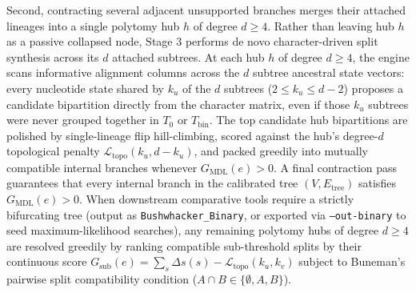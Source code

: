 \documentclass[11pt,a4paper]{article}
\begin{document}
Second, contracting several adjacent unsupported branches merges their attached lineages into a single polytomy hub $h$ of degree $d \ge 4$. Rather than leaving hub $h$ as a passive collapsed node, Stage 3 performs de novo character-driven split synthesis across its $d$ attached subtrees. At each hub $h$ of degree $d \ge 4$, the engine scans informative alignment columns across the $d$ subtree ancestral state vectors: every nucleotide state shared by $k_u$ of the $d$ subtrees ($2 \le k_u \le d - 2$) proposes a candidate bipartition directly from the character matrix, even if those $k_u$ subtrees were never grouped together in $T_0$ or $T_{\text{bin}}$. The top candidate hub bipartitions are polished by single-lineage flip hill-climbing, scored against the hub's degree-$d$ topological penalty $\mathcal{L}_{\text{topo}}(k_u, d - k_u)$, and packed greedily into mutually compatible internal branches whenever $G_{\text{MDL}}(e) > 0$. A final contraction pass guarantees that every internal branch in the calibrated tree $(V, E_{\text{tree}})$ satisfies $G_{\text{MDL}}(e) > 0$. When downstream comparative tools require a strictly bifurcating tree (output as \texttt{Bushwhacker\_Binary}, or exported via \texttt{--out-binary} to seed maximum-likelihood searches), any remaining polytomy hubs of degree $d \ge 4$ are resolved greedily by ranking compatible sub-threshold splits by their continuous score $G_{\text{sub}}(e) = \sum_{s} \Delta s(s) - \mathcal{L}_{\text{topo}}(k_u, k_v)$ subject to Buneman's pairwise split compatibility condition ($A \cap B \in \{\emptyset, A, B\}$).
\end{document}
